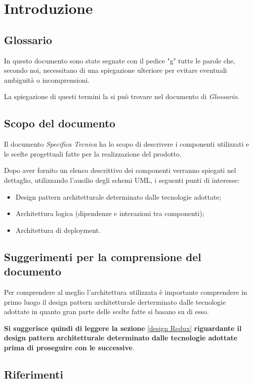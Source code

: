 \section{Introduzione}

\subsection{Glossario}
In questo documento sono state segnate con il pedice "g" tutte le parole che, secondo noi, necessitano di una spiegazione ulteriore per evitare
eventuali ambiguità o incomprensioni.

La spiegazione di questi termini la si può trovare nel documento di \textit{Glossario}.

\subsection{Scopo del documento}
Il documento \textit{Specifica Tecnica} ha lo scopo di descrivere i componenti utilizzati e le scelte progettuali fatte per la realizzazione del prodotto.

Dopo aver fornito un elenco descrittivo dei componenti verranno spiegati nel dettaglio, utilizzando l'ausilio degli schemi UML, i seguenti punti di interesse: 
\begin{itemize}
	\item Design pattern architetturale determinato dalle tecnologie adottate;
	\item Architettura logica (dipendenze e interazioni tra componenti);
	\item Architettura di deployment.
\end{itemize}

\subsection{Suggerimenti per la comprensione del documento}
Per comprendere al meglio l'architettura utilizzata è importante comprendere in primo luogo il design pattern
architetturale derterminato dalle tecnologie adottate in quanto gran parte delle scelte fatte si basano su di esso.

\textbf{Si suggerisce quindi di leggere la sezione} \ref{design Redux} \textbf{riguardante il design pattern architetturale determinato 
dalle tecnologie adottate prima di proseguire con le successive}.

\subsection{Riferimenti}
